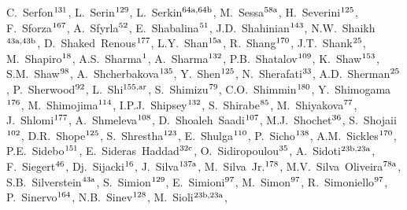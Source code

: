 \begin{flushleft}
C.~Serfon$^\textrm{\scriptsize 131}$,    
L.~Serin$^\textrm{\scriptsize 129}$,    
L.~Serkin$^\textrm{\scriptsize 64a,64b}$,    
M.~Sessa$^\textrm{\scriptsize 58a}$,    
H.~Severini$^\textrm{\scriptsize 125}$,    
F.~Sforza$^\textrm{\scriptsize 167}$,    
A.~Sfyrla$^\textrm{\scriptsize 52}$,    
E.~Shabalina$^\textrm{\scriptsize 51}$,    
J.D.~Shahinian$^\textrm{\scriptsize 143}$,    
N.W.~Shaikh$^\textrm{\scriptsize 43a,43b}$,    
D.~Shaked~Renous$^\textrm{\scriptsize 177}$,    
L.Y.~Shan$^\textrm{\scriptsize 15a}$,    
R.~Shang$^\textrm{\scriptsize 170}$,    
J.T.~Shank$^\textrm{\scriptsize 25}$,    
M.~Shapiro$^\textrm{\scriptsize 18}$,    
A.S.~Sharma$^\textrm{\scriptsize 1}$,    
A.~Sharma$^\textrm{\scriptsize 132}$,    
P.B.~Shatalov$^\textrm{\scriptsize 109}$,    
K.~Shaw$^\textrm{\scriptsize 153}$,    
S.M.~Shaw$^\textrm{\scriptsize 98}$,    
A.~Shcherbakova$^\textrm{\scriptsize 135}$,    
Y.~Shen$^\textrm{\scriptsize 125}$,    
N.~Sherafati$^\textrm{\scriptsize 33}$,    
A.D.~Sherman$^\textrm{\scriptsize 25}$,    
P.~Sherwood$^\textrm{\scriptsize 92}$,    
L.~Shi$^\textrm{\scriptsize 155,ar}$,    
S.~Shimizu$^\textrm{\scriptsize 79}$,    
C.O.~Shimmin$^\textrm{\scriptsize 180}$,    
Y.~Shimogama$^\textrm{\scriptsize 176}$,    
M.~Shimojima$^\textrm{\scriptsize 114}$,    
I.P.J.~Shipsey$^\textrm{\scriptsize 132}$,    
S.~Shirabe$^\textrm{\scriptsize 85}$,    
M.~Shiyakova$^\textrm{\scriptsize 77}$,    
J.~Shlomi$^\textrm{\scriptsize 177}$,    
A.~Shmeleva$^\textrm{\scriptsize 108}$,    
D.~Shoaleh~Saadi$^\textrm{\scriptsize 107}$,    
M.J.~Shochet$^\textrm{\scriptsize 36}$,    
S.~Shojaii$^\textrm{\scriptsize 102}$,    
D.R.~Shope$^\textrm{\scriptsize 125}$,    
S.~Shrestha$^\textrm{\scriptsize 123}$,    
E.~Shulga$^\textrm{\scriptsize 110}$,    
P.~Sicho$^\textrm{\scriptsize 138}$,    
A.M.~Sickles$^\textrm{\scriptsize 170}$,    
P.E.~Sidebo$^\textrm{\scriptsize 151}$,    
E.~Sideras~Haddad$^\textrm{\scriptsize 32c}$,    
O.~Sidiropoulou$^\textrm{\scriptsize 35}$,    
A.~Sidoti$^\textrm{\scriptsize 23b,23a}$,    
F.~Siegert$^\textrm{\scriptsize 46}$,    
Dj.~Sijacki$^\textrm{\scriptsize 16}$,    
J.~Silva$^\textrm{\scriptsize 137a}$,    
M.~Silva~Jr.$^\textrm{\scriptsize 178}$,    
M.V.~Silva~Oliveira$^\textrm{\scriptsize 78a}$,    
S.B.~Silverstein$^\textrm{\scriptsize 43a}$,    
S.~Simion$^\textrm{\scriptsize 129}$,    
E.~Simioni$^\textrm{\scriptsize 97}$,    
M.~Simon$^\textrm{\scriptsize 97}$,    
R.~Simoniello$^\textrm{\scriptsize 97}$,    
P.~Sinervo$^\textrm{\scriptsize 164}$,    
N.B.~Sinev$^\textrm{\scriptsize 128}$,    
M.~Sioli$^\textrm{\scriptsize 23b,23a}$,    

\end{flushleft}
